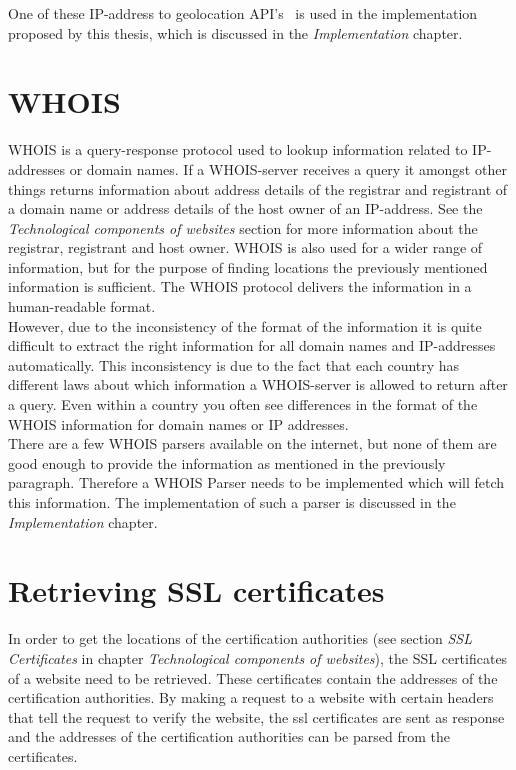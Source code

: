 \documentclass[twoside,openright,notitlepage]{uva-bachelor-thesis}
\begin{document}
One of these IP-address to geolocation API's~\cite{ipapi} is used in the implementation proposed by this thesis, which is discussed in the \emph{Implementation} chapter.

\section{WHOIS}
WHOIS is a query-response protocol used to lookup information related to IP-addresses or domain names. If a WHOIS-server receives a query it amongst other things returns information about address details of the registrar and registrant of a domain name or address details of the host owner of an IP-address. See the \emph{Technological components of websites} section for more information about the registrar, registrant and host owner. WHOIS is also used for a wider range of information, but for the purpose of finding locations the previously mentioned information is sufficient. The WHOIS protocol delivers the information in a human-readable format.\\

However, due to the inconsistency of the format of the information it is quite difficult to extract the right information for all domain names and IP-addresses automatically. This inconsistency is due to the fact that each country has different laws about which information a WHOIS-server is allowed to return after a query. Even within a country you often see differences in the format of the WHOIS information for domain names or IP addresses. \\

There are a few WHOIS parsers available on the internet, but none of them are good enough to provide the information as mentioned in the previously paragraph. Therefore a WHOIS Parser needs to be implemented which will fetch this information. The implementation of such a parser is discussed in the \emph{Implementation} chapter.

\section{Retrieving SSL certificates}
In order to get the locations of the certification authorities (see section \emph{SSL Certificates} in chapter \emph{Technological components of websites}), the SSL certificates of a website need to be retrieved. These certificates contain the addresses of the certification authorities. By making a request to a website with certain headers that tell the request to verify the website, the ssl certificates are sent as response and the addresses of the certification authorities can be parsed from the certificates. 
\end{document}
